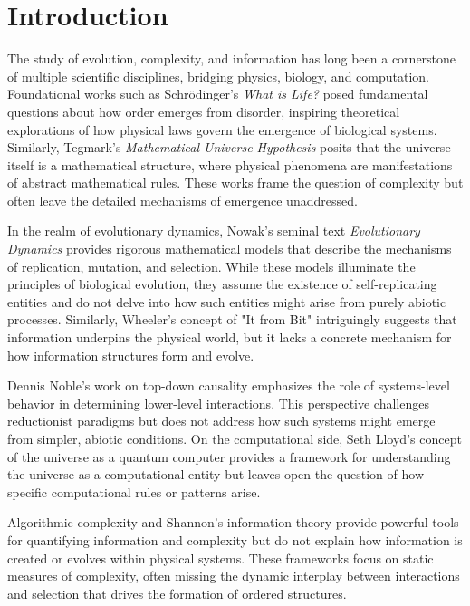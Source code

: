 \documentclass[entropy,article,submit,pdftex,moreauthors]{Definitions/mdpi}
\begin{document}


\section{Introduction}

The study of evolution, complexity, and information has long been a cornerstone of multiple scientific disciplines, bridging physics, biology, and computation. Foundational works such as Schrödinger's \textit{What is Life?} \cite{schrodinger1944life} posed fundamental questions about how order emerges from disorder, inspiring theoretical explorations of how physical laws govern the emergence of biological systems. Similarly, Tegmark's \textit{Mathematical Universe Hypothesis} \cite{tegmark2008mathematical} posits that the universe itself is a mathematical structure, where physical phenomena are manifestations of abstract mathematical rules. These works frame the question of complexity but often leave the detailed mechanisms of emergence unaddressed.

In the realm of evolutionary dynamics, Nowak's seminal text \textit{Evolutionary Dynamics} \cite{nowak2006evolutionary} provides rigorous mathematical models that describe the mechanisms of replication, mutation, and selection. While these models illuminate the principles of biological evolution, they assume the existence of self-replicating entities and do not delve into how such entities might arise from purely abiotic processes. Similarly, Wheeler's concept of "It from Bit" \cite{wheeler1990itbit} intriguingly suggests that information underpins the physical world, but it lacks a concrete mechanism for how information structures form and evolve.

Dennis Noble's work on top-down causality \cite{noble2012causality} emphasizes the role of systems-level behavior in determining lower-level interactions. This perspective challenges reductionist paradigms but does not address how such systems might emerge from simpler, abiotic conditions. On the computational side, Seth Lloyd’s concept of the universe as a quantum computer \cite{lloyd2006programming} provides a framework for understanding the universe as a computational entity but leaves open the question of how specific computational rules or patterns arise.

Algorithmic complexity \cite{kolmogorov1965complexity} \cite{chaitin1977algorithmic} \cite{solomonoff1964formal} and Shannon’s information theory \cite{shannon1948mathematical} provide powerful tools for quantifying information and complexity but do not explain how information is created or evolves within physical systems. These frameworks focus on static measures of complexity, often missing the dynamic interplay between interactions and selection that drives the formation of ordered structures.
\end{document}
